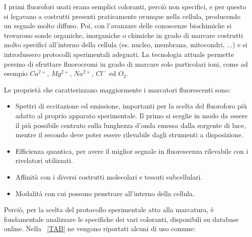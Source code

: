 I primi fluorofori usati erano semplici coloranti, perciò non specifici, e per questo si legavano a costrutti presenti praticamente ovunque nella cellula, producendo un segnale molto diffuso. 
Poi, con l'avanzare delle conoscenze biochimiche si trovarono sonde organiche, inorganiche o chimiche in grado di marcare costrutti molto specifici all'interno della cellula (es. nucleo, membrana, mitocondri, ...) e si introdussero protocolli sperimentali adeguati. 
La tecnologia attuale permette persino di sfruttare fluorocromi in grado di marcare solo particolari ioni, come ad esempio $Ca^{2+}$, $Mg^{2+}$, $Na^{2+}$, $Cl^-$ ed $O_2$.

Le proprietà che caratterizzano maggiormente i marcatori fluorescenti sono:

\begin{itemize}
\item Spettri di eccitazione ed emissione, importanti per la scelta del fluoroforo più adatto al proprio apparato sperimentale. 
Il primo si sceglie in modo da essere il più possibile centrato sulla lunghezza d'onda emessa dalla sorgente di luce, mentre il secondo deve poter essere rilevabile dagli strumenti a disposizione. 

\item Efficienza quantica, per avere il miglior segnale in fluorescenza rilevabile con i rivelatori utilizzati. 

\item Affinità con i diversi costrutti molecolari e tessuti subcellulari.

\item Modalità con cui possono penetrare all'interno della cellula.
\end{itemize}

Perciò, per la scelta del protocollo sperimentale atto alla marcatura, è fondamentale analizzare le specifiche dei vari coloranti, disponibili su database online. 
Nella \tablename~\ref{TAB} ne vengono riportati alcuni di uso comune:

